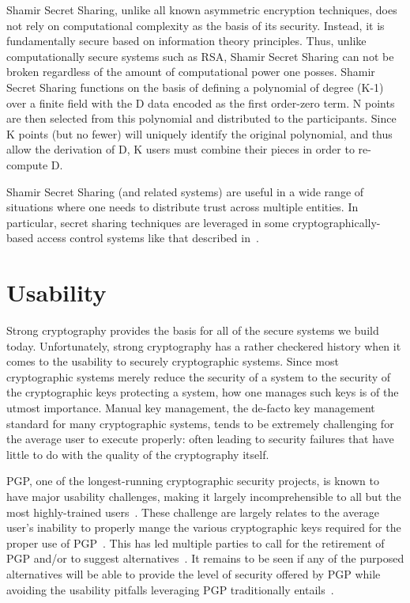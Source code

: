 Shamir Secret Sharing, unlike all known asymmetric encryption
techniques, does not rely on computational complexity as the basis of
its security. Instead, it is fundamentally secure based on information
theory principles. Thus, unlike computationally secure systems such as
RSA, Shamir Secret Sharing can not be broken regardless of the amount
of computational power one posses. Shamir Secret Sharing functions on
the basis of defining a polynomial of degree (K-1) over a finite field
with the D data encoded as the first order-zero term. N points are
then selected from this polynomial and distributed to the
participants. Since K points (but no fewer) will uniquely identify the
original polynomial, and thus allow the derivation of D, K users must
combine their pieces in order to re-compute D.

Shamir Secret Sharing (and related systems) are useful in a wide range
of situations where one needs to distribute trust across multiple
entities. In particular, secret sharing techniques are leveraged in
some cryptographically-based access control systems like that
described in~\cite{Goyal2006}.

\section{Usability}

Strong cryptography provides the basis for all of the secure systems
we build today. Unfortunately, strong cryptography has a rather
checkered history when it comes to the usability to securely
cryptographic systems. Since most cryptographic systems merely reduce
the security of a system to the security of the cryptographic keys
protecting a system, how one manages such keys is of the utmost
importance. Manual key management, the de-facto key management
standard for many cryptographic systems, tends to be extremely
challenging for the average user to execute properly: often leading to
security failures that have little to do with the quality of the
cryptography itself.

PGP, one of the longest-running cryptographic security projects, is
known to have major usability challenges, making it largely
incomprehensible to all but the most highly-trained
users~\cite{Whitten1999}. These challenge are largely relates to the
average user's inability to properly mange the various cryptographic
keys required for the proper use of PGP~\cite{green-challenge}. This
has led multiple parties to call for the retirement of PGP and/or to
suggest alternatives~\cite{mailpile, openwhisper, google-endtoend}. It
remains to be seen if any of the purposed alternatives will be able to
provide the level of security offered by PGP while avoiding the
usability pitfalls leveraging PGP traditionally
entails~\cite{green-pgp}.

